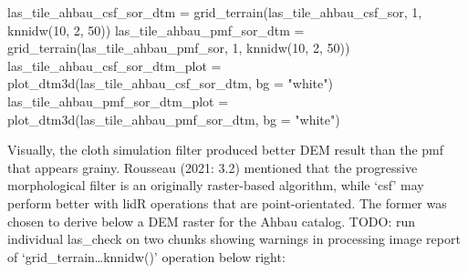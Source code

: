 \documentclass[
]{article}
\newenvironment{Shaded}{\begin{snugshade}}{\end{snugshade}}
\newcommand{\AttributeTok}[1]{\textcolor[rgb]{0.77,0.63,0.00}{#1}}
\newcommand{\DecValTok}[1]{\textcolor[rgb]{0.00,0.00,0.81}{#1}}
\newcommand{\FunctionTok}[1]{\textcolor[rgb]{0.00,0.00,0.00}{#1}}
\newcommand{\NormalTok}[1]{#1}
\newcommand{\OtherTok}[1]{\textcolor[rgb]{0.56,0.35,0.01}{#1}}
\newcommand{\StringTok}[1]{\textcolor[rgb]{0.31,0.60,0.02}{#1}}
\begin{document}
\begin{Shaded}
\begin{Highlighting}[]
\NormalTok{las\_tile\_ahbau\_csf\_sor\_dtm }\OtherTok{=} \FunctionTok{grid\_terrain}\NormalTok{(las\_tile\_ahbau\_csf\_sor, }\DecValTok{1}\NormalTok{, }\FunctionTok{knnidw}\NormalTok{(}\DecValTok{10}\NormalTok{, }\DecValTok{2}\NormalTok{, }\DecValTok{50}\NormalTok{))}
\NormalTok{las\_tile\_ahbau\_pmf\_sor\_dtm }\OtherTok{=} \FunctionTok{grid\_terrain}\NormalTok{(las\_tile\_ahbau\_pmf\_sor, }\DecValTok{1}\NormalTok{, }\FunctionTok{knnidw}\NormalTok{(}\DecValTok{10}\NormalTok{, }\DecValTok{2}\NormalTok{, }\DecValTok{50}\NormalTok{))}
\NormalTok{las\_tile\_ahbau\_csf\_sor\_dtm\_plot }\OtherTok{=} \FunctionTok{plot\_dtm3d}\NormalTok{(las\_tile\_ahbau\_csf\_sor\_dtm, }\AttributeTok{bg =} \StringTok{"white"}\NormalTok{) }
\NormalTok{las\_tile\_ahbau\_pmf\_sor\_dtm\_plot }\OtherTok{=} \FunctionTok{plot\_dtm3d}\NormalTok{(las\_tile\_ahbau\_pmf\_sor\_dtm, }\AttributeTok{bg =} \StringTok{"white"}\NormalTok{) }
\end{Highlighting}
\end{Shaded}

Visually, the cloth simulation filter produced better DEM result than
the pmf that appears grainy. Rousseau (2021: 3.2) mentioned that the
progressive morphological filter is an originally raster-based
algorithm, while `csf' may perform better with lidR operations that are
point-orientated. The former was chosen to derive below a DEM raster for
the Ahbau catalog. TODO: run individual las\_check on two chunks showing
warnings in processing image report of `grid\_terrain\ldots knnidw()'
operation below right:
\end{document}
